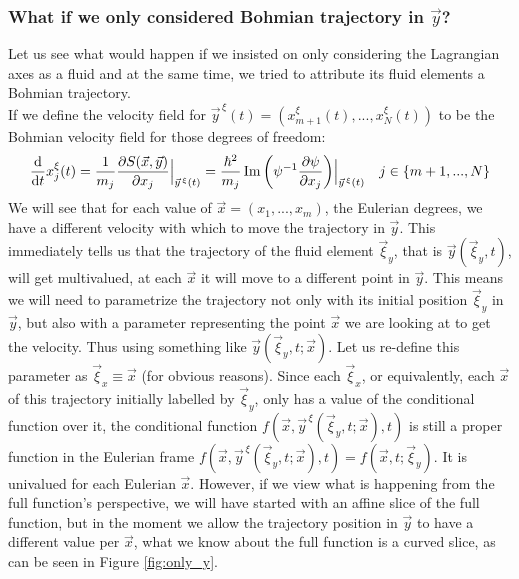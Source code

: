 \documentclass[11pt, a4paper]{article} %
\DeclareRobustCommand{\mybox}[2][gray!10]{%
\begin{tcolorbox}[   %
        left=0.2cm,
        right=0.2cm,
        top=0.15cm,
        bottom=0.15cm,
        colback=#1,
        colframe=#1,
        width=\dimexpr\textwidth\relax, 
        enlarge left by=0mm,
        boxsep=5pt,
        arc=0pt,outer arc=0pt,
        ]
        #2
\end{tcolorbox}
}
\begin{document}
\mybox{
\subsubsection*{What if we only considered Bohmian trajectory in $\vec{y}$?}

Let us see what would happen if we insisted on only considering the Lagrangian axes as a fluid and at the same time, we tried to attribute its fluid elements a Bohmian trajectory.\\

If we define the velocity field for $\vec{y}^{\, \xi}(t)=(x_{m+1}^\xi(t), ...,x_N^\xi(t))$ to be the Bohmian velocity field for those degrees of freedom:
\begin{equation}
\dv{}{t}x_j^\xi(t)=\frac{1}{m_j}\pdv{S(\vec{x}, \vec{y})}{x_j}\Big\rvert_{\vec{y}^{\, \xi}(t)}=\frac{\hbar^2}{m_j}\Im\qty( \psi^{-1} \pdv{\psi}{x_j})\Big\rvert_{\vec{y}^{\, \xi}(t)} \quad j\in\{m+1,...,N\}
\end{equation}
We will see that for each value of $\vec{x}=(x_1,...,x_m)$, the Eulerian degrees, we have a different velocity with which to move the trajectory in $\vec{y}$. This immediately tells us that the trajectory of the fluid element $\vec{\xi}_y$, that is $\vec{y}(\vec{\xi}_y,t)$, will get multivalued, at each $\vec{x}$ it will move to a different point in $\vec{y}$. This means we will need to parametrize the trajectory not only with its initial position $\vec{\xi}_y$ in $\vec{y}$, but also with a parameter representing the point $\vec{x}$ we are looking at to get the velocity. Thus using something like $\vec{y}(\vec{\xi}_y,t; \vec{x})$. Let us re-define this parameter as $\vec{\xi}_x\equiv \vec{x}$ (for obvious reasons). Since each $\vec{\xi}_x$, or equivalently, each $\vec{x}$ of this trajectory initially labelled by $\vec{\xi}_y$, only has a value of the conditional function over it, the conditional function $f(\vec{x},\vec{y}^{\, \xi}(\vec{\xi}_y,t; \vec{x}),t)$ is still a proper function in the Eulerian frame $f(\vec{x},\vec{y}^{\, \xi}(\vec{\xi}_y,t; \vec{x}),t)=f(\vec{x},t; \vec{\xi}_y)$. It is univalued for each Eulerian $\vec{x}$. However, if we view what is happening from the full function's perspective, we will have started with an affine slice of the full function, but in the moment we allow the trajectory position in $\vec{y}$ to have a different value per $\vec{x}$, what we know about the full function is a curved slice, as can be seen in Figure \ref{fig:only_y}.

}
\end{document}
